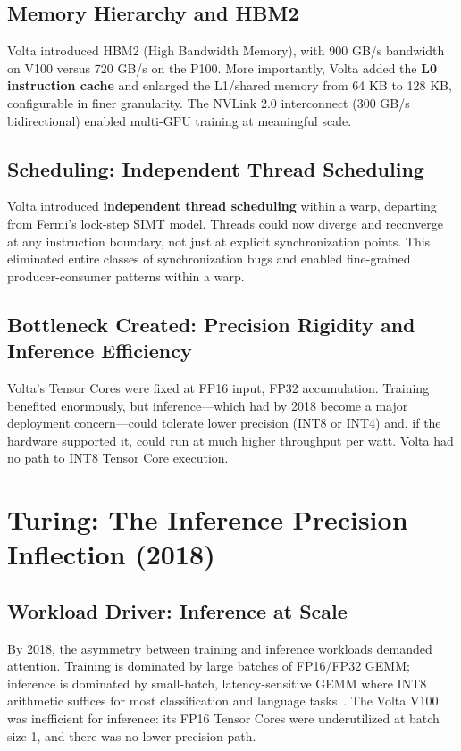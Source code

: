 \documentclass[10pt,twocolumn]{article}
\begin{document}
\subsection{Memory Hierarchy and HBM2}

Volta introduced HBM2 (High Bandwidth Memory), with 900 GB/s bandwidth on V100 versus 720 GB/s on the P100. More importantly, Volta added the \textbf{L0 instruction cache} and enlarged the L1/shared memory from 64 KB to 128 KB, configurable in finer granularity. The NVLink 2.0 interconnect (300 GB/s bidirectional) enabled multi-GPU training at meaningful scale.

\subsection{Scheduling: Independent Thread Scheduling}

Volta introduced \textbf{independent thread scheduling} within a warp, departing from Fermi's lock-step SIMT model. Threads could now diverge and reconverge at any instruction boundary, not just at explicit synchronization points. This eliminated entire classes of synchronization bugs and enabled fine-grained producer-consumer patterns within a warp.

\subsection{Bottleneck Created: Precision Rigidity and Inference Efficiency}

Volta's Tensor Cores were fixed at FP16 input, FP32 accumulation. Training benefited enormously, but inference—which had by 2018 become a major deployment concern—could tolerate lower precision (INT8 or INT4) and, if the hardware supported it, could run at much higher throughput per watt. Volta had no path to INT8 Tensor Core execution.

\section{Turing: The Inference Precision Inflection (2018)}
\label{sec:turing}

\subsection{Workload Driver: Inference at Scale}

By 2018, the asymmetry between training and inference workloads demanded attention. Training is dominated by large batches of FP16/FP32 GEMM; inference is dominated by small-batch, latency-sensitive GEMM where INT8 arithmetic suffices for most classification and language tasks~\citep{jacob2018quantization}. The Volta V100 was inefficient for inference: its FP16 Tensor Cores were underutilized at batch size 1, and there was no lower-precision path.
\end{document}
